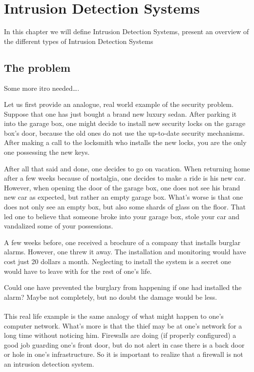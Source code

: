\chapter{Intrusion Detection Systems}
\minitoc
In \label{chap:IDS} this chapter we will define Intrusion Detection Systems, present an overview of the different types of Intrusion Detection Systems

\section{The problem}

Some more itro needed\ldots.

Let us first provide an analogue, real world example of the security problem. Suppose that one has just bought a brand new luxury sedan. After parking it into the garage box, one might decide to install new security locks on the garage box's door, because the old ones do not use the up-to-date security mechanisms. After making a call to the locksmith who installs the new locks, you are the only one possessing the new keys.

After all that said and done, one decides to go on vacation. When returning home after a few weeks because of nostalgia, one decides to make a ride is his new car. However, when opening the door of the garage box, one does not see his brand new car as expected, but rather an empty garage box. What's worse is that one does not only see an empty box, but also some shards of glass on the floor. That led one to believe that someone broke into your garage box, stole your car and vandalized some of your possessions.

A few weeks before, one received a brochure of a company that installs burglar alarms. However, one threw it away. The installation and monitoring would have cost just 20 dollars a month. Neglecting to install the system is a secret one would have to leave with for the rest of one's life.

Could one have prevented the burglary from happening if one had installed the alarm?  Maybe not completely, but no doubt the damage would be less. \\ \\
This real life example is the same analogy of what might happen to one's computer network. What's more is that the thief may be at one's network for a long time without noticing him. Firewalls are doing (if properly configured) a good job guarding one's front door, but do not alert in case there is a back door or hole in one's infrastructure. So it is important to realize that a firewall is not an intrusion detection system.

